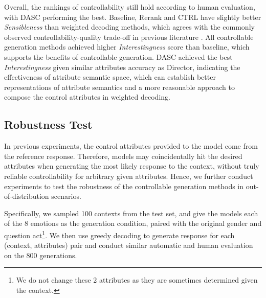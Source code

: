 Overall, the rankings of controllability still hold according to human evaluation, with DASC performing the best. Baseline, Rerank and CTRL have slightly better \textit{Sensibleness} than weighted decoding methods, which agrees with the commonly observed controllability-quality trade-off in previous literature \citep{dathathri2019plug,yang2021fudge,qian2022controllable}. All controllable generation methods achieved higher \textit{Interestingness} score than baseline, which supports the benefits of controllable generation. DASC achieved the best \textit{Interestingness} given similar attributes accuracy as Director, indicating the effectiveness of attribute semantic space, which can establish better representations of attribute semantics and a more reasonable approach to compose the control attributes in weighted decoding. 


\subsection{Robustness Test}
In previous experiments, the control attributes provided to the model come from the reference response. Therefore, models may coincidentally hit the desired attributes when generating the most likely response to the context, without truly reliable controllability for arbitrary given attributes. Hence, we further conduct experiments to test the robustness of the controllable generation methods in out-of-distribution scenarios. 

Specifically, we sampled 100 contexts from the test set, and give the models each of the 8 emotions as the generation condition, paired with the original gender and question act\footnote{We do not change these 2 attributes as they are sometimes determined given the context.}. We then use greedy decoding to generate response for each (context, attributes) pair and conduct similar automatic and human evaluation on the 800 generations. 

